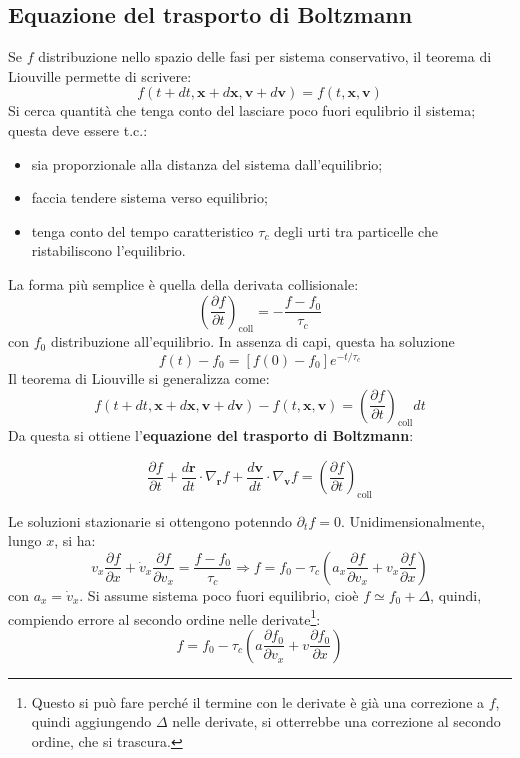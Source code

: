 \documentclass[10pt, a4paper]{scrartcl}
\numberwithin{equation}{subsection}
\theoremstyle{style1}
\newenvironment{boxenv}[1][]{
    \begin{eqbox}[#1]
    }{
   \end{eqbox}
}
\begin{document}
\subsection{Equazione del trasporto di Boltzmann}
Se $f$ distribuzione nello spazio delle fasi per sistema conservativo, il teorema di Liouville permette di scrivere:
\[
f(t+ dt , \mathbf{x} + d\mathbf{x} , \mathbf{v} +d \mathbf{v} ) = f(t,\mathbf{x} ,\mathbf{v} )
\] 
Si cerca quantit\`a che tenga conto del lasciare poco fuori equlibrio il sistema; questa deve essere t.c.:
\begin{itemize}
	\item  sia proporzionale alla distanza del sistema dall'equilibrio;
	\item faccia tendere sistema verso equilibrio;
	\item tenga conto del tempo caratteristico $\tau _c$ degli urti tra particelle che ristabiliscono l'equilibrio.
\end{itemize}
La forma pi\`u semplice \`e quella della derivata collisionale:
\begin{equation}
	\left(\frac{\partial f}{\partial t} \right) _\text{coll} = - \frac{f-f_0}{\tau _c}
\end{equation}
con $f_0$ distribuzione all'equilibrio. In assenza di capi, questa ha soluzione
\begin{equation}
	f(t) - f_0 = \left[ f(0) - f_0 \right] e^{-t  / \tau _c} 
\end{equation}
Il teorema di Liouville si generalizza come:
\begin{equation}
	f(t + dt, \mathbf{x} + d\mathbf{x} , \mathbf{v} + d\mathbf{v} ) - f(t, \mathbf{x} , \mathbf{v} ) = \left(\frac{\partial f}{\partial t} \right) _\text{coll} dt
\end{equation}
Da questa si ottiene l'\textbf{equazione del trasporto di Boltzmann}:
\begin{boxenv}[]
\begin{equation}
	\frac{\partial f}{\partial t} + \frac{d \mathbf{r} }{d t} \cdot \nabla _\mathbf{r} f + \frac{d \mathbf{v} }{d t} \cdot \nabla _\mathbf{v} f = \left(\frac{\partial f}{\partial t} \right) _\text{coll}
\end{equation}
\end{boxenv}
\noindent Le soluzioni stazionarie si ottengono potenndo $\partial _t f = 0$.
Unidimensionalmente, lungo $x$, si ha:
\[
v_x \frac{\partial f }{\partial x}  + \dot{v}_x \frac{\partial f}{\partial v_x}  = \frac{f- f_0}{\tau _c}\Rightarrow f = f_0 - \tau _c \left(a_x \frac{\partial f}{\partial v_x} + v_x \frac{\partial f}{\partial x} \right) 
\] 
con $a_x = \dot{v}_x$. Si assume sistema poco fuori equilibrio, cio\`e $f \simeq f_0 + \Delta $, quindi, compiendo errore al secondo ordine nelle derivate\footnote{Questo si pu\`o fare perch\'e il termine con le derivate \`e gi\`a una correzione a $f$, quindi aggiungendo $\Delta $ nelle derivate, si otterrebbe una correzione al secondo ordine, che si trascura.}:
\begin{equation}
	f = f_0 - \tau _c \left(a \frac{\partial f_0}{\partial v_x}  + v \frac{\partial f_0}{\partial x} \right) 
\end{equation}
\end{document}
